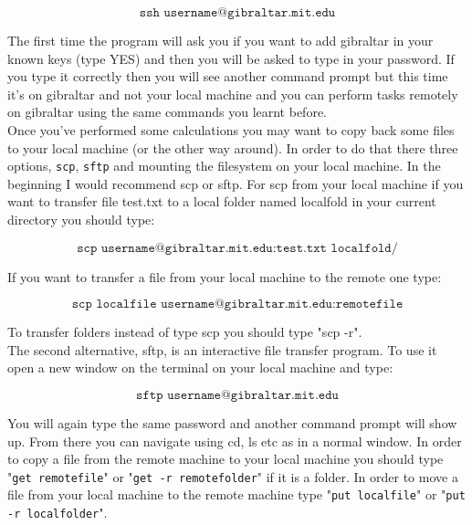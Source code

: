 \documentclass[a4paper,12pt]{assignment}
\begin{document}
\begin{equation*}
\texttt{ssh username@gibraltar.mit.edu}
\end{equation*}

The first time the program will ask you if you want to add gibraltar in your known keys (type YES) and then you will be asked to type in your password. If you type it correctly then you will see another command prompt but this time it's on gibraltar and not your local machine and you can perform tasks remotely on gibraltar using the same commands you learnt before. \\

Once you've performed some calculations you may want to copy back some files to your local machine (or the other way around). In order to do that there three options, \texttt{scp}, \texttt{sftp} and mounting the filesystem on your local machine. In the beginning I would recommend scp or sftp. For scp from your local machine if you want to transfer file test.txt to a local folder named localfold in your current directory you should type:

\begin{equation*}
\texttt{scp username@gibraltar.mit.edu:test.txt localfold/}
\end{equation*}

If you want to transfer a file from your local machine to the remote one type:

\begin{equation*}
\texttt{scp localfile username@gibraltar.mit.edu:remotefile}
\end{equation*}

To transfer folders instead of type scp you should type "scp -r". \\


The second alternative, sftp, is an interactive file transfer program. To use it open a new window on the terminal on your local machine and type:

\begin{equation*}
\texttt{sftp username@gibraltar.mit.edu}
\end{equation*}

You will again type the same password and another command prompt will show up. From there you can navigate using cd, ls etc as in a normal window. In order to copy a file from the remote machine to your local machine you should type "\texttt{get remotefile}" or "\texttt{get -r remotefolder}" if it is a folder. In order to move a file from your local machine to the remote machine type "\texttt{put localfile}" or "\texttt{put -r localfolder}". \\
\end{document}
